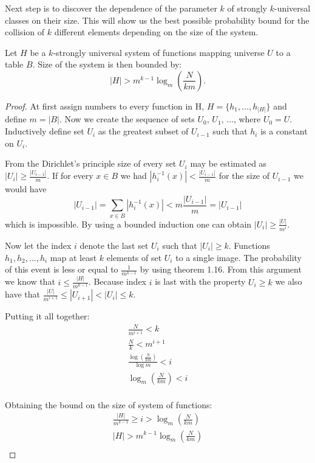 Next step is to discover the dependence of the parameter $k$ of strongly $k$-universal classes on their size. This will show us the best possible probability bound for the collision of $k$ different elements depending on the size of the system.
\begin{theorem}
Let $H$ be a $k$-strongly universal system of functions mapping universe $U$ to a table $B$. Size of the system is then bounded by:
\begin{displaymath}
|H| > m^{k - 1} \log_m \left( \frac{N}{km} \right) \textit{.}
\end{displaymath}
\end{theorem}
\begin{proof}
At first assign numbers to every function in H, $H = \{h_1, \dots, h_{|H|}\}$ and define $m = |B|$. Now we create the sequence of sets $U_0$, $U_1$, $\dots$, where $U_0 = U$. Inductively define set $U_i$ as the greatest subset of $U_{i - 1}$ such that $h_i$ is a constant on $U_i$. 

From the Dirichlet's principle size of every set $U_i$ may be estimated as $|U_i| \geq \frac{|U_{i - 1}|}{m}$. If for every $x \in B$ we had $|\displaystyle h_{i}^{-1}(x)| < \frac{|U_{i - 1}|}{m}$ for the size of $U_{i -1}$ we would have \[|U_{i -1}| = \displaystyle\sum_{x \in B} |\displaystyle h_{i}^{-1}(x)| < m\frac{|U_{i - 1}|}{m} = |U_{i -1}|\] which is impossible. By using a bounded induction one can obtain $|U_i| \geq \frac{|U|}{m^i}$.

Now let the index $i$ denote the last set $U_i$ such that $|U_i| \geq k$. Functions $h_1, h_2,\dots, h_i$ map at least $k$ elements of set $U_i$ to a single image. The probability of this event is less or equal to $\frac{1}{m ^ {k - 1}}$ by using theorem 1.16. From this argument we know that $i \leq \frac{|H|}{m ^ {k - 1}}$. Because index $i$ is last with the property $U_i \geq k$ we also have that $\frac{|U|}{m ^ {i + 1}} \leq |U_{i + 1}| < |U_i| \leq k$. 

Putting it all together:
\begin{gather*}
\frac{N}{m^{i + 1}} < k \\
\frac{N}{k} < m ^ {i + 1} \\
\frac{\log \left( \frac{N}{km} \right)}{\log m} < i \\
\log_m \left( \frac{N}{km} \right) < i \\
\end{gather*}

Obtaining the bound on the size of system of functions:
\begin{gather*}
\frac{|H|}{m^{k - 1}} \geq i > \log_m \left( \frac{N}{km} \right) \\
|H| > m^{k - 1} \log_m \left( \frac{N}{km} \right) \\
\end{gather*}
\end{proof}

